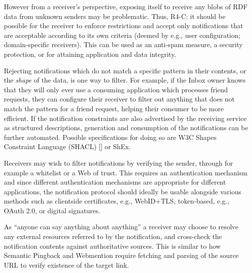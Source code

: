                                     
                                    
\par However from a receiver’s perspective, exposing itself to receive any blobs of RDF data from unknown senders may be problematic. Thus, R4-C: it should be possible for the receiver to enforce restrictions and accept only notifications that are acceptable according to its own criteria (deemed by e.g., user configuration; domain-specific receivers). This can be used as an anti-spam measure, a security protection, or for attaining application and data integrity.

                                    
\par Rejecting notifications which do not match a specific pattern in their contents, or the {\em shape} of the data, is one way to filter. For example, if the Inbox owner knows that they will only ever use a consuming application which processes friend requests, they can configure their receiver to filter out anything that does not match the pattern for a friend request, helping their consumer to be more efficient. If the notification constraints are also advertised by the receiving service as structured descriptions, generation and consumption of the notifications can be further automated. Possible specifications for doing so are W3C \empty Shapes Constraint Language (SHACL) [] or \empty ShEx.

                                    
\par Receivers may wish to filter notifications by verifying the sender, through for example a whitelist or a Web of trust. This requires an authentication mechanism and since different authentication mechanisms are appropriate for different applications, the notification protocol should ideally be usable alongside various methods such as clientside certificates, e.g., WebID+TLS, token-based, e.g., OAuth 2.0, or digital signatures.

                                    
\par As ``anyone can say anything about anything'' a receiver may choose to resolve any external resources referred to by the notification, and cross-check the notification contents against authoritative sources. This is similar to how Semantic Pingback and Webmention require fetching and parsing of the source URL to verify existence of the target link.
                                    
                                
                            

